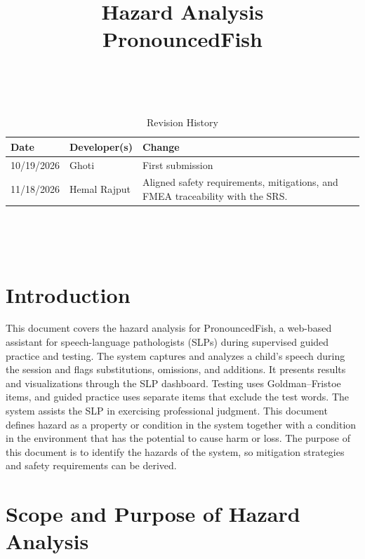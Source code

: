 \documentclass{article}
\title{Hazard Analysis\\PronouncedFish}
\author{\authname}
\date{}
\begin{document}
\maketitle
\thispagestyle{empty}

~\newpage


\begin{table}[hp]
\caption{Revision History} \label{TblRevisionHistory}
\begin{tabularx}{\textwidth}{llX}
\toprule
\textbf{Date} & \textbf{Developer(s)} & \textbf{Change}\\
\midrule
10/19/2026 & Ghoti & First submission\\
11/18/2026 & Hemal Rajput & Aligned safety requirements, mitigations, and FMEA traceability with the SRS.\\
\bottomrule
\end{tabularx}
\end{table}

~\newpage

\tableofcontents
\listoftables

~\newpage


\section{Introduction}

This document covers the hazard analysis for PronouncedFish, a web-based
assistant for speech-language pathologists (SLPs) during supervised guided
practice and testing. The system captures and analyzes a child's speech
during the session and flags substitutions, omissions, and additions. It
presents results and visualizations through the SLP dashboard. Testing uses
Goldman--Fristoe items, and guided practice uses separate items that exclude
the test words. The system assists the SLP in exercising professional judgment.
This document defines hazard as a property or condition in the system together with a condition in the environment that has the 
potential to cause harm or loss. 
The purpose of this document is to identify the hazards of the system, so mitigation strategies and safety requirements can be 
derived. 

\section{Scope and Purpose of Hazard Analysis}
\end{document}
